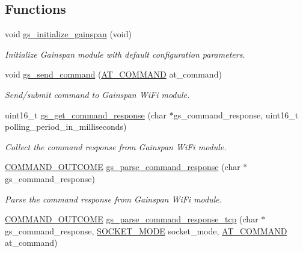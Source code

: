 \subsection*{Functions}
\begin{DoxyCompactItemize}
\item 
void \hyperlink{group__wireless__interface_ga0c19ab3a13d7f9277a818c80a3a3ca48}{gs\+\_\+initialize\+\_\+gainspan} (void)
\begin{DoxyCompactList}\small\item\em Initialize Gainspan module with default configuration parameters. \end{DoxyCompactList}\item 
void \hyperlink{group__wireless__interface_ga0cc6ad36a0579e034ffb389c1d2b9962}{gs\+\_\+send\+\_\+command} (\hyperlink{group__wireless__interface_ga4086b0cc4b349f6204256017ac437d3f}{A\+T\+\_\+\+C\+O\+M\+M\+A\+ND} at\+\_\+command)
\begin{DoxyCompactList}\small\item\em Send/submit command to Gainspan Wi\+Fi module. \end{DoxyCompactList}\item 
uint16\+\_\+t \hyperlink{group__wireless__interface_gaa828081a3f6e8a45985ae2cb55fa420e}{gs\+\_\+get\+\_\+command\+\_\+response} (char $\ast$gs\+\_\+command\+\_\+response, uint16\+\_\+t polling\+\_\+period\+\_\+in\+\_\+milliseconds)
\begin{DoxyCompactList}\small\item\em Collect the command response from Gainspan Wi\+Fi module. \end{DoxyCompactList}\item 
\hyperlink{group__wireless__interface_gab9cb187a993cee0dab2a6e72223e00d1}{C\+O\+M\+M\+A\+N\+D\+\_\+\+O\+U\+T\+C\+O\+ME} \hyperlink{group__wireless__interface_ga9da6bbc665d9662b6e33a264ad477b18}{gs\+\_\+parse\+\_\+command\+\_\+response} (char $\ast$gs\+\_\+command\+\_\+response)
\begin{DoxyCompactList}\small\item\em Parse the command response from Gainspan Wi\+Fi module. \end{DoxyCompactList}\item 
\hyperlink{group__wireless__interface_gab9cb187a993cee0dab2a6e72223e00d1}{C\+O\+M\+M\+A\+N\+D\+\_\+\+O\+U\+T\+C\+O\+ME} \hyperlink{group__wireless__interface_ga24ed385355f777402430ae15fef18344}{gs\+\_\+parse\+\_\+command\+\_\+response\+\_\+tcp} (char $\ast$gs\+\_\+command\+\_\+response, \hyperlink{group__wireless__interface_ga2bd47c85b6411d92d82236c49fbaf567}{S\+O\+C\+K\+E\+T\+\_\+\+M\+O\+DE} socket\+\_\+mode, \hyperlink{group__wireless__interface_ga4086b0cc4b349f6204256017ac437d3f}{A\+T\+\_\+\+C\+O\+M\+M\+A\+ND} at\+\_\+command)

\end{DoxyCompactItemize}
